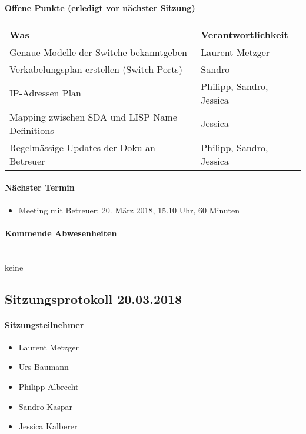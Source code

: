 \newpage 

\paragraph{Offene Punkte (erledigt vor nächster Sitzung)} \mbox{}

\begin{table}[H]
	\centering
	\begin{tabularx}{\textwidth}{X | p{4.5cm}}
		\rowcolor{gray!50}
		\textbf{Was} & \textbf{Verantwortlichkeit} \\
		\hline
		Genaue Modelle der Switche bekanntgeben & Laurent Metzger \\	
		Verkabelungsplan erstellen (Switch Ports) & Sandro \\
		IP-Adressen Plan & Philipp, Sandro, Jessica \\
		Mapping zwischen SDA und LISP Name Definitions & Jessica \\
		Regelmässige Updates der Doku an Betreuer & Philipp, Sandro, Jessica \\
	\end{tabularx}
	\label{tab:my-label}
\end{table}

\paragraph{Nächster Termin}
\begin{itemize}	
	\item Meeting mit Betreuer: 20. März 2018, 15.10 Uhr, 60 Minuten
\end{itemize}

\paragraph{Kommende Abwesenheiten} \mbox{}\\
keine
\newpage





\subsection{Sitzungsprotokoll 20.03.2018}

\paragraph{Sitzungsteilnehmer}
\begin{itemize}	
	\item Laurent Metzger 
	\item Urs Baumann
	\item Philipp Albrecht
	\item Sandro Kaspar
	\item Jessica Kalberer
\end{itemize}

